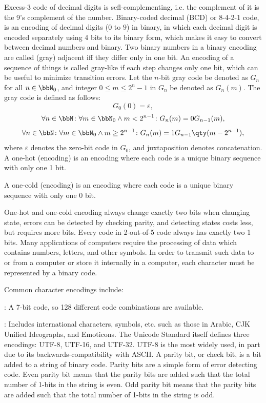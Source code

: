 \documentclass[a4paper,12pt]{report}
\begin{document}
Excess-3 code of decimal digits is sefl-complementing, i.e. the complement of it is the 9's complement of the number.
Binary-coded decimal (BCD) or 8-4-2-1 code, is an encoding of decimal digits ($0$ to $9$) in binary, in which each decimal digit is encoded separately using 4 bits to its binary form, which makes it easy to convert between decimal numbers and binary.
Two binary numbers in a binary encoding are called (gray) adjacent iff they differ only in one bit. An encoding of a sequence of things is called gray-like if each step changes only one bit, which can be useful to minimize transition errors.
Let the $n$-bit gray code be denoted as $G_n$ for all $n\in\bbN_0$, and integer $0\leq m\leq 2^n-1$ in $G_n$ be denoted as $G_n(m)$. The gray code is defined as follows:
\[G_0(0)=\varepsilon,\]
\[\forall n\in\bbN\colon\forall m\in\bbN_0\land m<2^{n-1}\colon G_n(m)=0G_{n-1}(m),\]
\[\forall n\in\bbN\colon\forall m\in\bbN_0\land m\geq 2^{n-1}\colon G_n(m)=1G_{n-1}\qty(m-2^{n-1}),\]
where $\varepsilon$ denotes the zero-bit code in $G_0$, and juxtaposition denotes concatenation.
A one-hot (encoding) is an encoding where each code is a unique binary sequence with only one 1 bit.

A one-cold (encoding) is an encoding where each code is a unique binary sequence with only one 0 bit.

One-hot and one-cold encoding always change exactly two bits when changing state, errors can be detected by checking parity, and detecting states costs less, but requires more bits.
Every code in 2-out-of-5 code always has exactly two 1 bits.
Many applications of computers require the processing of data which contains numbers, letters, and other symbols. In order to transmit such data to or from a computer or store it internally in a computer, each character must be represented by a binary code.

Common character encodings include:
\bit
\item{}: A 7-bit code, so 128 different code combinations are available.
\item{}: Includes international characters, symbols, etc. such as those in Arabic, CJK Unified Ideographs, and Emoticons. The Unicode Standard itself defines three encodings: UTF-8, UTF-16, and UTF-32. UTF-8 is the most widely used, in part due to its backwards-compatibility with ASCII.
\eit
{}
A parity bit, or check bit, is a bit added to a string of binary code. Parity bits are a simple form of error detecting code. Even parity bit means that the parity bits are added such that the total number of 1-bits in the string is even. Odd parity bit means that the parity bits are added such that the total number of 1-bits in the string is odd.
\end{document}
